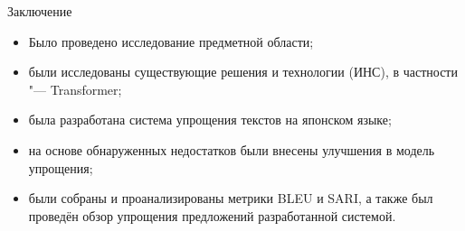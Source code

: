 \begin{frame}[fragile]{Заключение}%
  \begin{itemize}%
    \item Было проведено исследование предметной области;
    \item были исследованы существующие решения и технологии (ИНС), в частности "--- Transformer;
    \item была разработана система упрощения текстов на японском языке;
    \item на основе обнаруженных недостатков были внесены улучшения в модель упрощения;
    \item были собраны и проанализированы метрики BLEU и SARI, а также был проведён обзор упрощения предложений разработанной системой.
  \end{itemize}
\end{frame}
